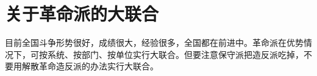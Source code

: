 \section[关于革命派的大联合（一九六七年四月）]{关于革命派的大联合}


目前全国斗争形势很好，成绩很大，经验很多，全国都在前进中。革命派在优势情况下，可按系统、按部门、按单位实行大联合。但要注意保守派把造反派吃掉，不要用解散革命造反派的办法实行大联合。


